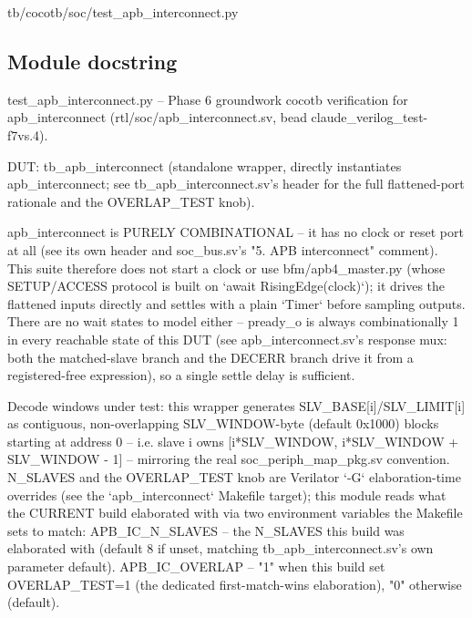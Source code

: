 \begin{relocated}{tb/cocotb/soc/test_apb_interconnect.py}

\subsection*{Module docstring}

\begin{textblock}
test_apb_interconnect.py -- Phase 6 groundwork cocotb verification for apb_interconnect
(rtl/soc/apb_interconnect.sv, bead claude_verilog_test-f7vs.4).

DUT: tb_apb_interconnect (standalone wrapper, directly instantiates apb_interconnect; see
tb_apb_interconnect.sv's header for the full flattened-port rationale and the OVERLAP_TEST knob).

apb_interconnect is PURELY COMBINATIONAL -- it has no clock or reset port at all (see its own
header and soc_bus.sv's "5. APB interconnect" comment). This suite therefore does not start a
clock or use bfm/apb4_master.py (whose SETUP/ACCESS protocol is built on
`await RisingEdge(clock)`); it drives the flattened inputs directly and settles with a plain
`Timer` before sampling outputs. There are no wait states to model either -- pready_o is always
combinationally 1 in every reachable state of this DUT (see apb_interconnect.sv's response mux:
both the matched-slave branch and the DECERR branch drive it from a registered-free expression),
so a single settle delay is sufficient.

Decode windows under test: this wrapper generates SLV_BASE[i]/SLV_LIMIT[i] as contiguous,
non-overlapping SLV_WINDOW-byte (default 0x1000) blocks starting at address 0 -- i.e.
slave i owns [i*SLV_WINDOW, i*SLV_WINDOW + SLV_WINDOW - 1] -- mirroring the real
soc_periph_map_pkg.sv convention. N_SLAVES and the OVERLAP_TEST knob are Verilator `-G`
elaboration-time overrides (see the `apb_interconnect` Makefile target); this module reads what
the CURRENT build elaborated with via two environment variables the Makefile sets to match:
APB_IC_N_SLAVES  -- the N_SLAVES this build was elaborated with (default 8 if unset, matching
tb_apb_interconnect.sv's own parameter default).
APB_IC_OVERLAP   -- "1" when this build set OVERLAP_TEST=1 (the dedicated first-match-wins
elaboration), "0" otherwise (default).


\end{textblock}
\end{relocated}
